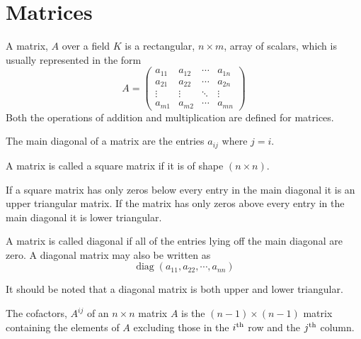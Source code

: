 \section{Matrices}
\label{sec:matrixtheory}

\begin{definition}[Matrix]
  A matrix, $A$ over a field $K$ is a rectangular, $n \times m$, array of scalars, which is usually represented in the form
\[ A =
\begin{pmatrix}
  a_{11} & a_{12} & \cdots & a_{1n} \\
  a_{21} & a_{22} & \cdots & a_{2n} \\
  \vdots & \vdots & \ddots & \vdots \\
  a_{m1} & a_{m2} & \cdots & a_{mn}
\end{pmatrix}
\]
Both the operations of addition and multiplication are defined for matrices.
\end{definition}
\begin{definition}
  The main diagonal of a matrix are the entries $a_{ij}$ where $j=i$.
\end{definition}
\begin{definition}
  A matrix is called a square matrix if it is of shape $(n \times n)$.
\end{definition}

\begin{definition}
  If a square matrix has only zeros below every entry in the main
  diagonal it is an upper triangular matrix. If the matrix has only
  zeros above every entry in the main diagonal it is lower triangular.
\end{definition}

\begin{definition}
  A matrix is called diagonal if all of the entries lying off the main
  diagonal are zero. A diagonal matrix may also be written as 
  \[ \operatorname{diag}(a_{11}, a_{22}, \cdots, a_{nn}) \]
\end{definition}
It should be noted that a diagonal matrix is both upper and lower
triangular.

\begin{definition}
  The cofactors, $A^{ij}$ of an $n \times n$ matrix $A$ is the
  $(n-1) \times (n-1)$ matrix containing the elements of $A$ excluding
  those in the $i^{\rm th}$ row and the $j^{\rm th}$ column.
\end{definition}

